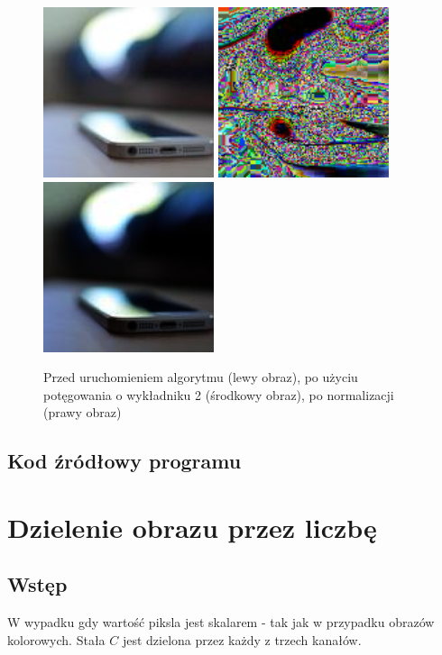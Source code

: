 \documentclass[a4paper,12pt]{book}
\begin{document}
\begin{figure}[H]
	\caption{Przed uruchomieniem algorytmu (lewy obraz), po użyciu potęgowania o wykładniku 2 (środkowy obraz), po normalizacji (prawy obraz)}
	\includegraphics[width=5cm, height=5cm]{phone-unmodified.jpg}
	\includegraphics[width=5cm, height=5cm]{3-4/power-color-phone-2.png}
	\includegraphics[width=5cm, height=5cm]{3-4/power-color-phone-2-norm.png}
\end{figure}

\subsection*{Kod źródłowy programu}

\section{Dzielenie obrazu przez liczbę}
\subsection*{Wstęp}
W wypadku gdy wartość piksla jest skalarem - tak jak w przypadku obrazów kolorowych. Stała $C$ jest dzielona przez każdy z trzech kanałów. 
\end{document}
